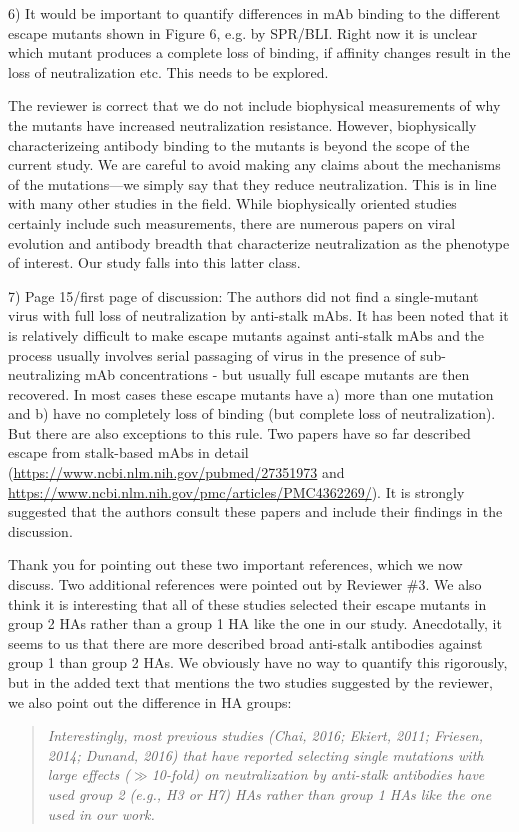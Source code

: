 \documentclass[11pt, oneside]{article}   	%
\begin{document}
6) It would be important to quantify differences in mAb binding to the different escape mutants shown in Figure 6, e.g. by SPR/BLI. Right now it is unclear which mutant produces a complete loss of binding, if affinity changes result in the loss of neutralization etc. This needs to be explored.

{\color{black}
The reviewer is correct that we do not include biophysical measurements of why the mutants have increased neutralization resistance.
However, biophysically characterizeing antibody binding to the mutants is beyond the scope of the current study.
We are careful to avoid making any claims about the mechanisms of the mutations---we simply say that they reduce neutralization.
This is in line with many other studies in the field.
While biophysically oriented studies certainly include such measurements, there are numerous papers on viral evolution and antibody breadth that characterize neutralization as the phenotype of interest.
Our study falls into this latter class.
}

7) Page 15/first page of discussion: The authors did not find a single-mutant virus with full loss of neutralization by anti-stalk mAbs. It has been noted that it is relatively difficult to make escape mutants against anti-stalk mAbs and the process usually involves serial passaging of virus in the presence of sub-neutralizing mAb concentrations - but usually full escape mutants are then recovered. In most cases these escape mutants have a) more than one mutation and b) have no completely loss of binding (but complete loss of neutralization). But there are also exceptions to this rule. Two papers have so far described escape from stalk-based mAbs in detail (\url{https://www.ncbi.nlm.nih.gov/pubmed/27351973} and \url{https://www.ncbi.nlm.nih.gov/pmc/articles/PMC4362269/}). It is strongly suggested that the authors consult these papers and include their findings in the discussion.

{\color{black}
Thank you for pointing out these two important references, which we now discuss.
Two additional references were pointed out by Reviewer \#3.
We also think it is interesting that all of these studies selected their escape mutants in group 2 HAs rather than a group 1 HA like the one in our study.
Anecdotally, it seems to us that there are more described broad anti-stalk antibodies against group 1 than group 2 HAs.
We obviously have no way to quantify this rigorously, but in the added text that mentions the two studies suggested by the reviewer, we also point out the difference in HA groups:

\begin{quote}
\textsl{Interestingly, most previous studies (Chai, 2016; Ekiert, 2011; Friesen, 2014; Dunand, 2016) that have reported selecting single mutations with large effects ($\gg$10-fold) on neutralization by anti-stalk antibodies have used group 2 (e.g., H3 or H7) HAs rather than group 1 HAs like the one used in our work.}
\end{quote}
}
\end{document}
